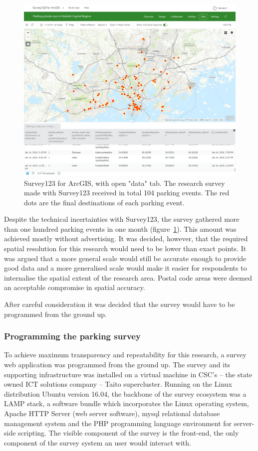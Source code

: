 \begin{figure}[H]%
    \includegraphics[width=\textwidth]{images/survey123_dataview.png}
    \caption[Survey123 data tab]{Survey123 for ArcGIS, with open "data" tab. The research survey made with Survey123 received in total 104 parking events. The red dots are the final destinations of each parking event.}%
    \label{fig:survey123_dataview}%
\end{figure}

Despite the technical incertainties with Survey123, the survey gathered more than one hundred parking events in one month (figure~\ref{fig:survey123_dataview}). This amount was achieved mostly without advertising. It was decided, however, that the required spatial resolution for this research would need to be lower than exact points. It was argued that a more general scale would still be accurate enough to provide good data and a more generalised scale would make it easier for respondents to internalise the spatial extent of the research area. Postal code areas were deemed an acceptable compromise in spatial accuracy.

After careful consideration it was decided that the survey would have to be programmed from the ground up.

\subsubsection{Programming the parking survey}
\justify
To achieve maximum transparency and repeatability for this research, a survey web application was programmed from the ground up. The survey and its supporting infrastructure was installed on a virtual machine in CSC's -- the state owned ICT solutions company -- Taito supercluster. Running on the Linux distribution Ubuntu version 16.04, the backbone of the survey ecosystem was a LAMP stack, a software bundle which incorporates the Linux operating system, Apache HTTP Server (web server software), \gls{mysql} relational database management system and the PHP programming language environment for server-side scripting. The visible component of the survey is the front-end, the only component of the survey system an user would interact with.

